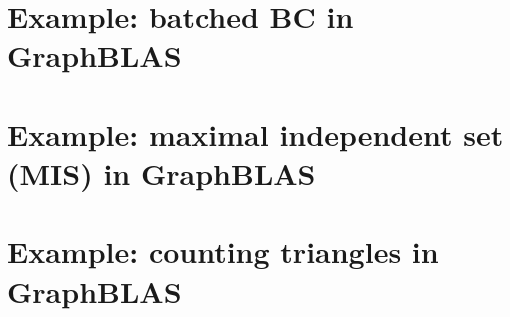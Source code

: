 %

\pagebreak
\nolinenumbers
\section{Example: batched BC in GraphBLAS}
{\scriptsize

}

\pagebreak
\nolinenumbers
\section{Example: maximal independent set (MIS) in GraphBLAS}
{\scriptsize

}

\pagebreak
\nolinenumbers
\section{Example: counting triangles in GraphBLAS}
{\scriptsize

}
\vfill
\pagebreak
